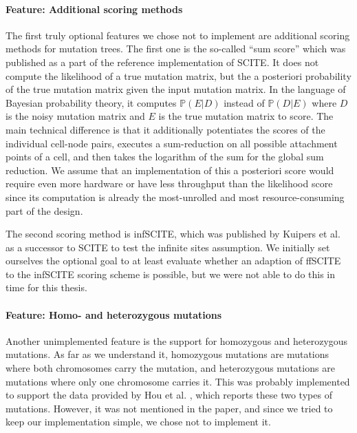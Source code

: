 \paragraph{Feature: Additional scoring methods}
The first truly optional features we chose not to implement are additional scoring methods for mutation trees. The first one is the so-called ``sum score'' which was published as a part of the reference implementation of \ac{SCITE}. It does not compute the likelihood of a true mutation matrix, but the a posteriori probability of the true mutation matrix given the input mutation matrix. In the language of Bayesian probability theory, it computes $\mathbb{P}(E|D)$ instead of $\mathbb{P}(D|E)$ where $D$ is the noisy mutation matrix and $E$ is the true mutation matrix to score. The main technical difference is that it additionally potentiates the scores of the individual cell-node pairs, executes a sum-reduction on all possible attachment points of a cell, and then takes the logarithm of the sum for the global sum reduction. We assume that an implementation of this a posteriori score would require even more hardware or have less throughput than the likelihood score since its computation is already the most-unrolled and most resource-consuming part of the design.

The second scoring method is \ac{infSCITE}, which was published by Kuipers et al. \cite{kuipers2017single} as a successor to \ac{SCITE} to test the infinite sites assumption. We initially set ourselves the optional goal to at least evaluate whether an adaption of \ac{ffSCITE} to the \ac{infSCITE} scoring scheme is possible, but we were not able to do this in time for this thesis.

\paragraph{Feature: Homo- and heterozygous mutations}
Another unimplemented feature is the support for homozygous and heterozygous mutations. As far as we understand it, homozygous mutations are mutations where both chromosomes carry the mutation, and heterozygous mutations are mutations where only one chromosome carries it. This was probably implemented to support the data provided by Hou et al. \cite{hou2012single}, which reports these two types of mutations. However, it was not mentioned in the paper, and since we tried to keep our implementation simple, we chose not to implement it.

